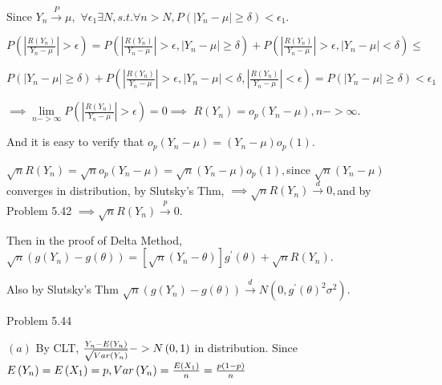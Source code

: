 \documentclass{article}
\begin{document}
Since $Y_{n}\overset{P}{\rightarrow }\mu ,$ $\forall \epsilon _{1}\exists
N,s.t.\forall n>N,P\left( \left\vert Y_{n}-\mu \right\vert \geq \delta
\right) <\epsilon _{1}.$

$P\left( \left\vert \frac{R\left( Y_{n}\right) }{Y_{n}-\mu }\right\vert
>\epsilon \right) =P\left( \left\vert \frac{R\left( Y_{n}\right) }{Y_{n}-\mu 
}\right\vert >\epsilon ,\left\vert Y_{n}-\mu \right\vert \geq \delta \right)
+P\left( \left\vert \frac{R\left( Y_{n}\right) }{Y_{n}-\mu }\right\vert
>\epsilon ,\left\vert Y_{n}-\mu \right\vert <\delta \right) \leq $

$P\left( \left\vert Y_{n}-\mu \right\vert \geq \delta \right) +P\left(
\left\vert \frac{R\left( Y_{n}\right) }{Y_{n}-\mu }\right\vert >\epsilon
,\left\vert Y_{n}-\mu \right\vert <\delta ,\left\vert \frac{R\left(
Y_{n}\right) }{Y_{n}-\mu }\right\vert <\epsilon \right) =P\left( \left\vert
Y_{n}-\mu \right\vert \geq \delta \right) <\epsilon _{1}$

$\implies \underset{n->\infty }{\lim }P\left( \left\vert \frac{R\left(
Y_{n}\right) }{Y_{n}-\mu }\right\vert >\epsilon \right) =0\implies $ $%
R\left( Y_{n}\right) =o_{p}\left( Y_{n}-\mu \right) ,n->\infty .$

And it is easy to verify that $o_{p}\left( Y_{n}-\mu \right) =\left(
Y_{n}-\mu \right) o_{p}\left( 1\right) .$

$\sqrt{n}R\left( Y_{n}\right) =\sqrt{n}o_{p}\left( Y_{n}-\mu \right) =\sqrt{n%
}\left( Y_{n}-\mu \right) o_{p}\left( 1\right) ,$since $\sqrt{n}\left(
Y_{n}-\mu \right) $ converges in distribution, by Slutsky's Thm, $\implies 
\sqrt{n}R\left( Y_{n}\right) \overset{d}{\rightarrow }0,$and by Problem 5.42 
$\implies \sqrt{n}R\left( Y_{n}\right) \overset{p}{\rightarrow }0.$

Then in the proof of Delta Method,$\sqrt{n}\left( g\left( Y_{n}\right)
-g\left( \theta \right) \right) =\left[ \sqrt{n}\left( Y_{n}-\theta \right) %
\right] g^{\prime }\left( \theta \right) +\sqrt{n}R\left( Y_{n}\right) .$

Also by Slutsky's Thm $\sqrt{n}\left( g\left( Y_{n}\right) -g\left( \theta
\right) \right) \overset{d}{\rightarrow }N\left( 0,g^{\prime }\left( \theta
\right) ^{2}\sigma ^{2}\right) .$

Problem 5.44

$\left( a\right) $ By CLT, $\frac{Y_{n}-E\left( Y_{n}\right) }{\sqrt{%
Var\left( Y_{n}\right) }}->N\left( 0,1\right) $ in distribution. Since $%
E\left( Y_{n}\right) =E\left( X_{1}\right) =p,Var\left( Y_{n}\right) =\frac{%
E\left( X_{1}\right) }{n}=\frac{p\left( 1-p\right) }{n}$
\end{document}

